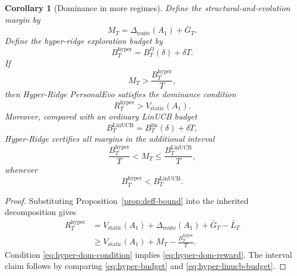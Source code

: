 \documentclass{article} %
\newtheorem{corollary}[theorem]{Corollary}
\begin{document}
\begin{corollary}[Dominance in more regimes]
\label{cor:hyper-dominance}
Define the structural-and-evolution margin by
\begin{equation}
\label{eq:hyper-margin}
M_T
=
\Delta_{\mathrm{route}}(A_1)+\bar G_T.
\end{equation}
Define the hyper-ridge exploration budget by
\begin{equation}
\label{eq:hyper-budget}
B_T^{\mathrm{hyper}}
=
B_T^\Omega(\delta)+\delta T.
\end{equation}
If
\begin{equation}
\label{eq:hyper-dom-condition}
M_T
>
\frac{B_T^{\mathrm{hyper}}}{T},
\end{equation}
then Hyper-Ridge PersonalEvo satisfies the dominance condition
\begin{equation}
\label{eq:hyper-dom-reward}
R_T^{\mathrm{hyper}}
>
V_{\mathrm{static}}(A_1).
\end{equation}
Moreover, compared with an ordinary LinUCB budget
\begin{equation}
\label{eq:hyper-linucb-budget}
B_T^{\mathrm{LinUCB}}
=
B_T^{\mathrm{lin}}(\delta)+\delta T,
\end{equation}
Hyper-Ridge certifies all margins in the additional interval
\begin{equation}
\label{eq:hyper-new-regime}
\frac{B_T^{\mathrm{hyper}}}{T}
<
M_T
\le
\frac{B_T^{\mathrm{LinUCB}}}{T},
\end{equation}
whenever
\begin{equation}
\label{eq:hyper-budget-order}
B_T^{\mathrm{hyper}}
<
B_T^{\mathrm{LinUCB}}.
\end{equation}
\end{corollary}

\begin{proof}
Substituting Proposition~\ref{prop:deff-bound} into the inherited decomposition gives
\begin{equation}
\label{eq:hyper-cor-proof}
\begin{aligned}
R_T^{\mathrm{hyper}}
&=
V_{\mathrm{static}}(A_1)
+
\Delta_{\mathrm{route}}(A_1)
+
\bar G_T
-
\bar L_T
\\
&\ge
V_{\mathrm{static}}(A_1)
+
M_T
-
\frac{B_T^{\mathrm{hyper}}}{T}.
\end{aligned}
\end{equation}
Condition \eqref{eq:hyper-dom-condition} implies \eqref{eq:hyper-dom-reward}. The interval claim follows by comparing \eqref{eq:hyper-budget} and \eqref{eq:hyper-linucb-budget}.
\end{proof}
\end{document}
